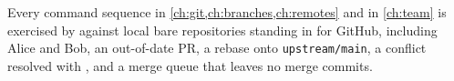 \begin{solution}
Every command sequence in \cref{ch:git,ch:branches,ch:remotes} and in
\cref{ch:team} is exercised by  against
local bare repositories standing in for GitHub, including Alice and Bob,
an out-of-date PR, a rebase onto \texttt{upstream/main}, a conflict resolved
with , and a merge queue that leaves no merge
commits.
\end{solution}
